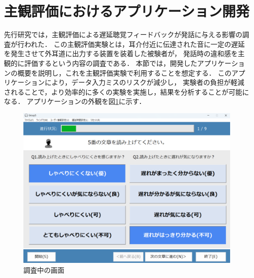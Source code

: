 \section{主観評価におけるアプリケーション開発}
先行研究\cite{cf:kayama}では，主観評価による遅延聴覚フィードバックが発話に与える影響の調査が行われた．
この主観評価実験とは，耳介付近に伝達された音に一定の遅延を発生させて外耳道に出力する装置を装着した被験者が，
発話時の違和感を主観的に評価するという内容の調査である．
本節では，開発したアプリケーションの概要を説明し，これを主観評価実験で利用することを想定する．
このアプリケーションにより，データ入力ミスのリスクが減少し，
実験者の負担が軽減されることで，より効率的に多くの実験を実施し，結果を分析することが可能になる．
アプリケーションの外観を図\ref{fig:2_userInterface}に示す．
\begin{figure}[tbp]
  \centering
  \includegraphics[scale=0.22]{figures/Syukann/app_2.pdf}
  \caption{調査中の画面}
  \label{fig:2_userInterface}
\end{figure}